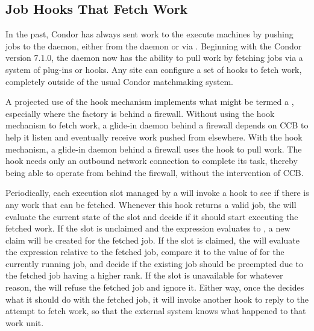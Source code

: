 \subsection{\label{sec:job-hooks}Job Hooks That Fetch Work}

In the past, Condor has always sent work to the execute machines by
pushing jobs to the  daemon, either from the 
daemon or via .
Beginning with the Condor version 7.1.0, the  daemon now has the
ability to pull work by fetching jobs via a system of plug-ins or
hooks.
Any site can configure a set of hooks to fetch work, completely
outside of the usual Condor matchmaking system.

A projected use of the hook mechanism implements what might
be termed a , especially where the
factory is behind a firewall.
Without using the hook mechanism to fetch work,
a glide-in  daemon behind a firewall
depends on CCB to help it listen and eventually receive
work pushed from elsewhere.
With the hook mechanism, a glide-in  daemon
behind a firewall uses the hook to pull work.
The hook needs only an outbound network connection to complete
its task,
thereby being able to operate from behind the firewall,
without the intervention of CCB.

Periodically, each execution slot managed by a  will
invoke a hook to see if there is any work that can be fetched.
Whenever this hook returns a valid job, the  will
evaluate the current state of the slot and decide if it should start
executing the fetched work.
If the slot is unclaimed and the  expression evaluates to
, a new claim will be created for the fetched job.
If the slot is claimed, the  will evaluate the
 expression relative to the fetched job, compare it to
the value of  for the currently running job, and decide
if the existing job should be preempted due to the fetched job having
a higher rank.
If the slot is unavailable for whatever reason, the 
will refuse the fetched job and ignore it.
Either way, once the  decides what it should do with
the fetched job, it will invoke another hook to reply to the attempt
to fetch work, so that the external system knows what happened to that
work unit.

